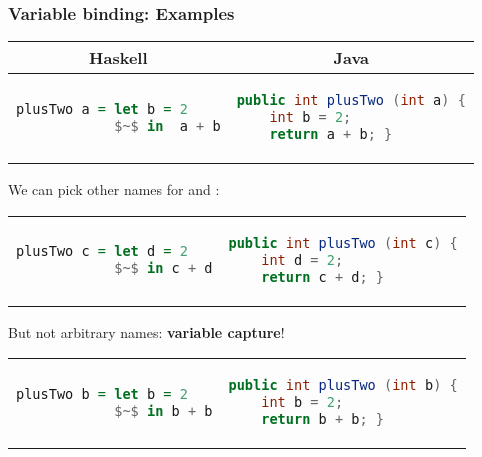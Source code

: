 \documentclass[10pt]{beamer}
\begin{document}
\begin{frame}[fragile]
  \frametitle{Variable binding: Examples}
  \begin{table}
    \begin{tabular}{p{5cm} p{5cm}}
      \hline
      \multicolumn{1}{c}{\bfseries Haskell} & \multicolumn{1}{c}{\bfseries Java}\\
      \hline
      \begin{lstlisting}[language=Haskell]
plusTwo a = let b = 2
            $~$ in  a + b
      \end{lstlisting}&
      \begin{lstlisting}[language=Java]
public int plusTwo (int a) {
    int b = 2;
    return a + b; }
      \end{lstlisting}
    \end{tabular}
  \end{table}\vspace{-1.5em}
  \pause
  \centering
  We can pick other names for  and :
  \begin{table}\vspace{-2.5em}
  \begin{tabular}{p{5cm} p{5cm}}
      \begin{lstlisting}[language=Haskell]
plusTwo c = let d = 2
            $~$ in c + d
      \end{lstlisting}&
      \begin{lstlisting}[language=Java]
public int plusTwo (int c) {
    int d = 2;
    return c + d; }
      \end{lstlisting}
  \end{tabular}
  \end{table}\vspace{-1.5em}
  \pause
  But not arbitrary names: \textbf{variable capture}!
  \begin{table}\vspace{-2.5em}
  \begin{tabular}{p{5cm} p{5cm}}
  \begin{lstlisting}[language=Haskell]
plusTwo b = let b = 2
            $~$ in b + b
      \end{lstlisting}&
      \begin{lstlisting}[language=Java]
public int plusTwo (int b) {
    int b = 2;
    return b + b; }
      \end{lstlisting}
  \end{tabular}
  \end{table}
\end{frame}
\end{document}
